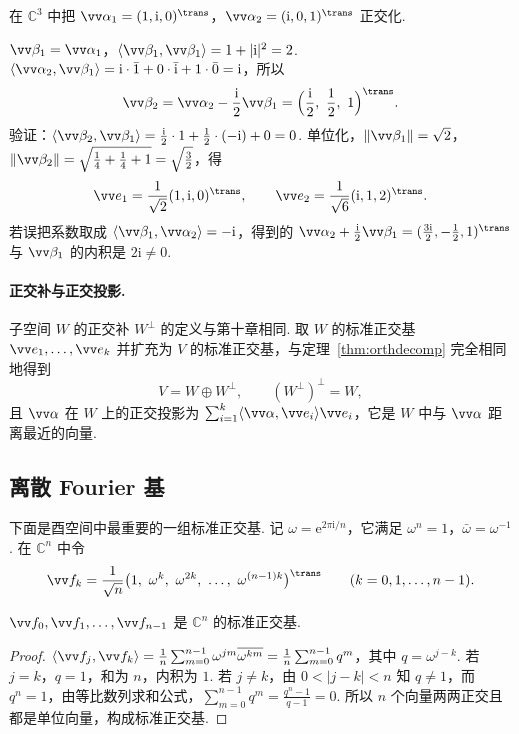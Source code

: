 	\begin{example}
		在 $\mathbb{C}^3$ 中把 $\vv\alpha_1=(1,\mathrm i,0)^\trans$，$\vv\alpha_2=(\mathrm i,0,1)^\trans$ 正交化.
	\end{example}
	\begin{solution}
		$\vv\beta_1=\vv\alpha_1$，$\langle\vv\beta_1,\vv\beta_1\rangle=1+|\mathrm i|^2=2$. $\langle\vv\alpha_2,\vv\beta_1\rangle=\mathrm i\cdot\bar1+0\cdot\bar{\mathrm i}+1\cdot\bar0=\mathrm i$，所以
		\[\vv\beta_2=\vv\alpha_2-\frac{\mathrm i}2\vv\beta_1=\Big(\frac{\mathrm i}2,\ \frac12,\ 1\Big)^\trans.\]
		验证：$\langle\vv\beta_2,\vv\beta_1\rangle=\frac{\mathrm i}2\cdot1+\frac12\cdot(-\mathrm i)+0=0$. 单位化，$\|\vv\beta_1\|=\sqrt2$，$\|\vv\beta_2\|=\sqrt{\frac14+\frac14+1}=\sqrt{\frac32}$，得
		\[\vv e_1=\frac1{\sqrt2}(1,\mathrm i,0)^\trans,\qquad\vv e_2=\frac1{\sqrt6}(\mathrm i,1,2)^\trans.\]
		若误把系数取成 $\langle\vv\beta_1,\vv\alpha_2\rangle=-\mathrm i$，得到的 $\vv\alpha_2+\frac{\mathrm i}2\vv\beta_1=(\frac{3\mathrm i}2,-\frac12,1)^\trans$ 与 $\vv\beta_1$ 的内积是 $2\mathrm i\ne0$.
	\end{solution}
	
	\paragraph*{正交补与正交投影.} 子空间 $W$ 的正交补 $W^\perp$ 的定义与第十章相同. 取 $W$ 的标准正交基 $\vv e_1,\ldots,\vv e_k$ 并扩充为 $V$ 的标准正交基，与定理~\ref{thm:orthdecomp} 完全相同地得到
	\[V=W\oplus W^\perp,\qquad(W^\perp)^\perp=W,\]
	且 $\vv\alpha$ 在 $W$ 上的正交投影为 $\sum_{i=1}^k\langle\vv\alpha,\vv e_i\rangle\vv e_i$，它是 $W$ 中与 $\vv\alpha$ 距离最近的向量.
	
	\subsection{离散 Fourier 基}
	
	下面是酉空间中最重要的一组标准正交基. 记 $\omega=\mathrm e^{2\pi\mathrm i/n}$，它满足 $\omega^n=1$，$\bar\omega=\omega^{-1}$. 在 $\mathbb{C}^n$ 中令
	\[\vv f_k=\frac1{\sqrt n}\big(1,\ \omega^k,\ \omega^{2k},\ \ldots,\ \omega^{(n-1)k}\big)^\trans\qquad(k=0,1,\ldots,n-1).\]
	
	\begin{proposition}\label{prop:fourierbasis}
		$\vv f_0,\vv f_1,\ldots,\vv f_{n-1}$ 是 $\mathbb{C}^n$ 的标准正交基.
	\end{proposition}
	\begin{proof}
		$\langle\vv f_j,\vv f_k\rangle=\frac1n\sum_{m=0}^{n-1}\omega^{jm}\overline{\omega^{km}}=\frac1n\sum_{m=0}^{n-1}q^m$，其中 $q=\omega^{j-k}$. 若 $j=k$，$q=1$，和为 $n$，内积为 $1$. 若 $j\ne k$，由 $0<|j-k|<n$ 知 $q\ne1$，而 $q^n=1$，由等比数列求和公式，$\sum_{m=0}^{n-1}q^m=\frac{q^n-1}{q-1}=0$. 所以 $n$ 个向量两两正交且都是单位向量，构成标准正交基.
	\end{proof}
	
